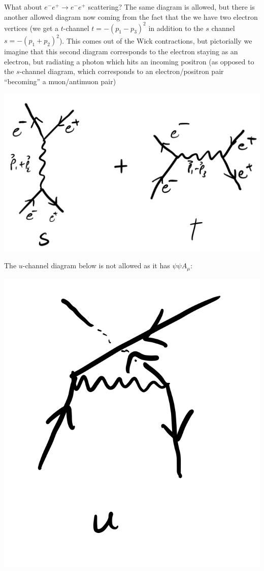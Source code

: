 What about $e^-e^+ \to e^-e^+$ scattering? The same diagram is allowed, but there is another allowed diagram now coming from the fact that the we have two electron vertices (we get a $t$-channel  $t = -(p_1 - p_3)^2$ in addition to the $s$ channel $s = -(p_1 + p_2)^2$). This comes out of the Wick contractions, but pictorially we imagine that this second diagram corresponds to the electron staying as an electron, but radiating a photon which hits an incoming positron (as opposed to the $s$-channel diagram, which corresponds to an electron/positron pair ``becoming'' a muon/antimuon pair)

\begin{center}
    \includegraphics[scale=0.35]{Lectures/Images/lec13-stchannels.png}
\end{center}

The $u$-channel diagram below is not allowed as it has $\psi\psi A_\mu$:

\begin{center}
    \includegraphics[scale=0.35]{Lectures/Images/lec13-uchannel.png}
\end{center}

